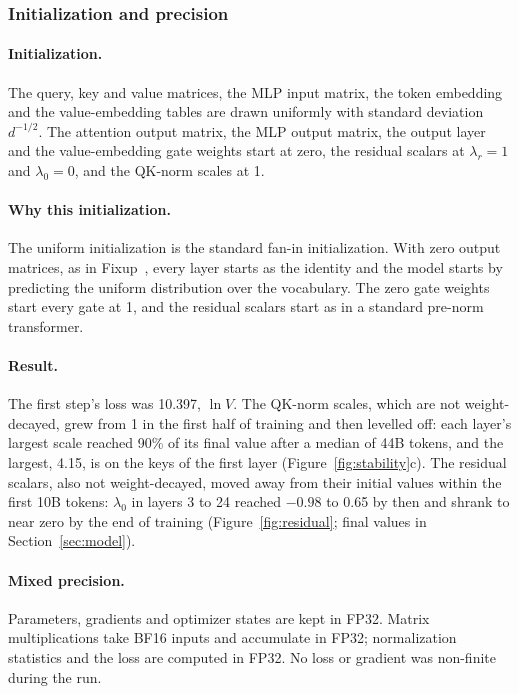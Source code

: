 \documentclass[sigconf,nonacm,balance=false]{acmart}
\begin{document}
\subsubsection{Initialization and precision}
\label{sec:init}

\paragraph{Initialization.} The query, key and value matrices, the MLP input matrix, the token embedding and the
value-embedding tables are drawn uniformly with standard deviation $d^{-1/2}$. The attention output matrix, the MLP
output matrix, the output layer and the value-embedding gate weights start at zero, the residual scalars at
$\lambda_r = 1$ and $\lambda_0 = 0$, and the QK-norm scales at 1.

\paragraph{Why this initialization.} The uniform initialization is the standard fan-in initialization. With zero
output matrices, as in Fixup~\cite{zhang2019fixup}, every layer
starts as the identity and the model starts by predicting the uniform distribution over the vocabulary. The zero gate
weights start every gate at 1, and the residual scalars start as in a standard pre-norm transformer.

\paragraph{Result.} The first step's loss was 10.397, $\ln V$. The QK-norm scales, which are not weight-decayed, grew
from 1 in the first half of training and then levelled off: each layer's largest scale reached 90\% of its final value
after a median of 44B tokens, and the largest, 4.15, is on the keys of the first layer (Figure~\ref{fig:stability}c).
The residual scalars, also not weight-decayed, moved away from their initial values within the first 10B tokens:
$\lambda_0$ in layers 3 to 24 reached $-0.98$ to 0.65 by then and shrank to near zero by the end of training
(Figure~\ref{fig:residual}; final values in Section~\ref{sec:model}).

\paragraph{Mixed precision.} Parameters, gradients and optimizer states are kept in FP32. Matrix multiplications take
BF16 inputs and accumulate in FP32; normalization
statistics and the loss are computed in FP32. No loss or gradient was non-finite during the run.
\end{document}
